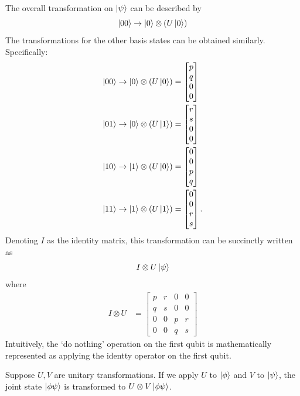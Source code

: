 The overall transformation on $\ket{\psi}$ can be described by
$$
    \ket{00} \rightarrow \ket{0} \otimes (U\ket{0})
$$
The transformations for the other basis states can be obtained similarly. Specifically:
\begin{align*}
    \ket{00} &\rightarrow \ket{0} \otimes (U\ket{0}) = \begin{bmatrix}
        p \\ q \\ 0 \\ 0
    \end{bmatrix} \\
    \ket{01} &\rightarrow \ket{0} \otimes (U\ket{1}) = \begin{bmatrix}
        r \\ s \\ 0 \\ 0
    \end{bmatrix} \\
    \ket{10} &\rightarrow \ket{1} \otimes (U\ket{0}) = \begin{bmatrix}
        0 \\ 0 \\ p \\ q
    \end{bmatrix} \\
    \ket{11} &\rightarrow \ket{1} \otimes (U\ket{1}) = \begin{bmatrix}
        0 \\ 0 \\ r \\s
    \end{bmatrix}.
\end{align*}
Denoting $I$ as the identity matrix, this transformation can be succinctly written as
$$
    I \otimes U \ket{\psi}
$$
where
\begin{align*}
    I \otimes U &= \begin{bmatrix}
        p & r & 0 & 0 \\
        q & s & 0 & 0 \\
        0 & 0 & p & r \\
        0 & 0 & q & s
    \end{bmatrix}
\end{align*}
Intuitively, the `do nothing' operation on the first qubit is mathematically represented as applying the identty operator on the first qubit.

\begin{theorem}
Suppose $U, V$ are unitary transformations.
If we apply $U$ to $\ket{\phi}$ and $V$ to $\ket{\psi}$, the joint state $\ket{\phi\psi}$ is transformed to $U \otimes V \ket{\phi\psi}$.
\end{theorem}

